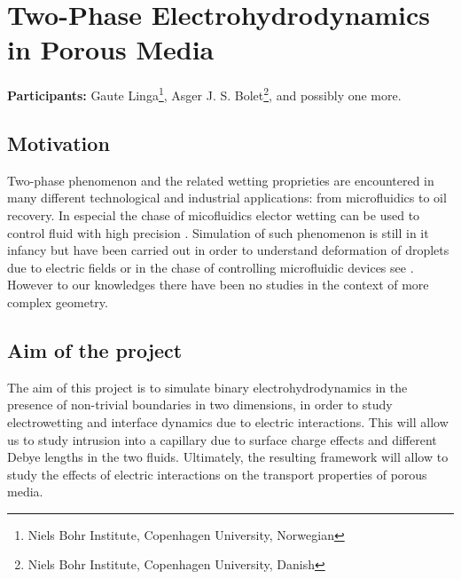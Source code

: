 \documentclass[a4paper,10pt]{article}
\begin{document}
\section*{Two-Phase Electrohydrodynamics in Porous Media}
\textbf{Participants:} Gaute Linga\footnote{Niels Bohr Institute, Copenhagen University, Norwegian}, Asger J. S. Bolet\footnote{Niels Bohr Institute, Copenhagen University, Danish}, and possibly one more.


\subsection*{Motivation}
Two-phase phenomenon and the related wetting proprieties are encountered in many different technological and industrial applications: from microfluidics to oil recovery\cite{bonn2009}. 
In especial the chase of micofluidics elector wetting can be used to control fluid with high precision \cite{mugele2005}. 
Simulation of such phenomenon is still in it infancy but have been carried out in order to understand deformation of droplets due to electric fields\cite{yang2013,yang2014} or in the chase of controlling microfluidic devices see \cite{zeng2011}. 
However to our knowledges there have been no studies in the context of more complex geometry. 

\subsection*{Aim of the project}
The aim of this project is to simulate binary electrohydrodynamics in the presence of non-trivial boundaries in two dimensions, in order to study electrowetting and interface dynamics due to electric interactions.
This will allow us to study intrusion into a capillary due to surface charge effects and different Debye lengths in the two fluids.
Ultimately, the resulting framework will allow to study the effects of electric interactions on the transport properties of porous media.
\end{document}

